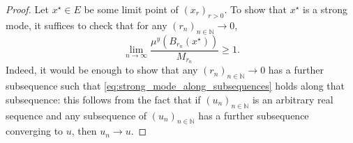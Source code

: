 \documentclass[10pt,a4paper]{amsart}
\newcommand*{\Naturals}{\mathbb{N}}
\newcommand*{\cball}[2]{B_{#2}(#1)}
\renewcommand*{\geq}{\geqslant}
\begin{document}
\begin{proof}
	Let $x^{\star} \in E$ be some limit point of $(x_{r})_{r > 0}$. 
	To show that $x^{\star}$ is a strong mode, it suffices to check that for any $(r_{n})_{n \in \Naturals} \to 0$,
	\begin{equation} \label{eq:strong_mode_along_subsequences}
		\lim_{n \to \infty} \frac{\mu^{y}(\cball{x^{\star}}{r_{n}})}{M_{r_{n}}} \geq 1.
	\end{equation}
	Indeed, it would be enough to show that any $(r_{n})_{n \in \Naturals} \to 0$ has a further subsequence such that \eqref{eq:strong_mode_along_subsequences} holds along that subsequence:
	this follows from the fact that if $(u_n)_{n \in \Naturals}$ is an arbitrary real sequence and any subsequence of $(u_n)_{n \in \Naturals}$ has a further subsequence converging to $u$, then $u_n \to u$.


\end{proof}
\end{document}
